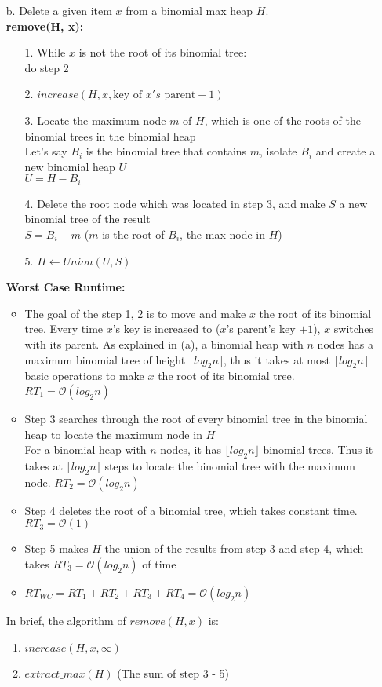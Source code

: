 \documentclass[10pt]{article}
\begin{document}
\begin{enumerate}
\item[b.]Delete a given item $x$ from a binomial max heap $H$.\\
\textbf{remove(H, x):}
\begin{enumerate}
\item[1.]While $x$ is not the root of its binomial tree: \\do step 2
\item[2.]$increase(H, x, \text{key of }x's\text{ parent} + 1)$
\item[3.]Locate the maximum node $m$ of $H$, which is one of the roots of the binomial trees in the binomial heap\\
Let's say $B_i$ is the binomial tree that contains $m$, isolate $B_i$ and create a new binomial heap $U$\\
$U=H-B_i$
\item[4.]Delete the root node which was located in step 3, and make $S$ a new binomial tree of the result\\
$S=B_i-m$ \null\hfill ($m$ is the root of $B_i$, the max node in $H$)
\item[5.]$H\leftarrow Union(U,S)$
\end{enumerate}
\textbf{Worst Case Runtime:}
\begin{itemize}
\item
The goal of the step 1, 2 is to move and make $x$ the root of its binomial tree. Every time $x$'s key is increased to ($x$'s parent's key $+1$), $x$ switches with its parent. As explained in (a), a binomial heap with $n$ nodes has a maximum binomial tree of height $\lfloor log_2n\rfloor$, thus it takes at most $\lfloor log_2n\rfloor$ basic operations to make $x$ the root of its binomial tree. $RT_1=\mathcal{O}(log_2n)$
\item
Step 3 searches through the root of every binomial tree in the binomial heap to locate the maximum node in $H$\\
For a binomial heap with $n$ nodes, it has $\lfloor log_2n\rfloor$ binomial trees. Thus it takes at $\lfloor log_2n\rfloor$ steps to locate the binomial tree with the maximum node. $RT_2=\mathcal{O}(log_2n)$
\item
Step 4 deletes the root of a binomial tree, which takes constant time. $RT_3=\mathcal{O}(1)$
\item 
Step 5 makes $H$ the union of the results from step 3 and step 4, which takes $RT_3=\mathcal{O}(log_2n)$ of time
\item
$RT_{WC} = RT_1 + RT_2 + RT_3 + RT_4 = \mathcal{O}(log_2n)$
\end{itemize}
In brief, the algorithm of $remove(H, x)$ is:
\begin{enumerate}
\item $increase(H,x,\infty)$
\item $extract\_max(H)$ \null\hfill (The sum of step 3 - 5)
\end{enumerate}




\end{enumerate}
\end{document}
